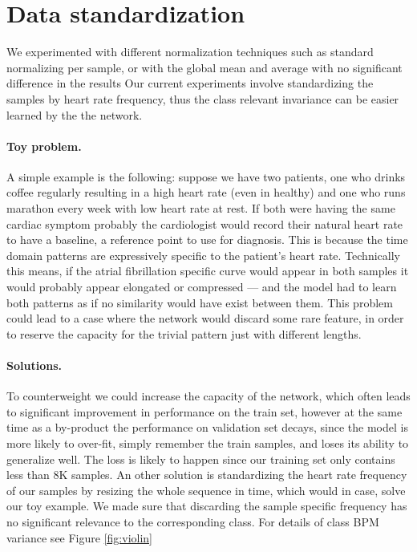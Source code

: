 \section{Data standardization}
We experimented with different normalization techniques such as standard normalizing per sample, or with the global mean and average with no significant difference in the results
Our current experiments involve standardizing the samples by heart rate frequency, thus the class relevant invariance can be easier learned by the the network.

\paragraph{Toy problem.}
A simple example is the following: suppose we have two patients, one who drinks coffee regularly resulting in a high heart rate (even in healthy) and one who runs marathon every week with low heart rate at rest.
If both were having the same cardiac symptom probably the cardiologist would record their natural heart rate to have a baseline, a reference point to use for diagnosis.
This is because the time domain patterns are expressively specific to the patient's heart rate.
Technically this means, if the atrial fibrillation specific curve would appear in both samples it would probably appear elongated or compressed --- and the model had to learn both patterns as if no similarity would have exist between them.
This problem could lead to a case where the network would discard some rare feature, in order to reserve the capacity for the trivial pattern just with different lengths.
\cite{Figure Same pattern different frequency}
\paragraph{Solutions.}
To counterweight we could increase the capacity of the network, which often leads to significant improvement in performance on the train set, however at the same time as a by-product the performance on validation set decays, since the model is more likely to over-fit, simply remember the train samples, and loses its ability to generalize well.
The loss is likely to happen since our training set only contains less than 8K samples.
An other solution is standardizing the heart rate frequency of our samples by resizing the whole sequence in time, which would in case, solve our toy example.
We made sure that discarding the sample specific frequency has no significant relevance to the corresponding class. For details of class BPM variance see Figure \ref{fig:violin}


